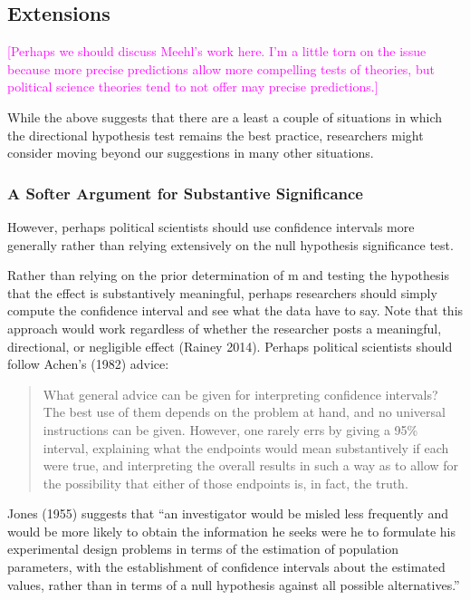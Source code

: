 \documentclass[12pt]{article}
\newcommand{\carlisle}[1]{\textcolor{magenta}{#1}}
\begin{document}
\subsection*{Extensions}

\carlisle{[Perhaps we should discuss Meehl's work here. I'm a little torn on the issue because more precise predictions allow more compelling tests of theories, but political science theories tend to not offer may precise predictions.]}


While the above suggests that there are a least a couple of situations in which the directional hypothesis test remains the best practice, researchers might consider moving beyond our suggestions in many other situations. 

\subsubsection*{A Softer Argument for Substantive Significance}

However, perhaps political scientists should use confidence intervals more generally rather than relying extensively on the null hypothesis significance test.

Rather than relying on the prior determination of m and testing the hypothesis that the effect is substantively meaningful, perhaps researchers should simply compute the confidence interval and see what the data have to say. Note that this approach would work regardless of whether the researcher posts a meaningful, directional, or negligible effect (Rainey 2014). Perhaps political scientists should follow Achen's (1982) advice:

\begin{quote}
What general advice can be given for interpreting confidence intervals? The best use of them depends on the problem at hand, and no universal instructions can be given. However, one rarely errs by giving a 95\% interval, explaining what the endpoints would mean substantively if each were true, and interpreting the overall results in such a way as to allow for the possibility that either of those endpoints is, in fact, the truth.
\end{quote}

Jones (1955) suggests that ``an investigator would be misled less frequently and would be more likely to obtain the information he seeks were he to formulate his experimental design problems in terms of the estimation of population parameters, with the establishment of confidence intervals about the estimated values, rather than in terms of a null hypothesis against all possible alternatives.''
\end{document}
